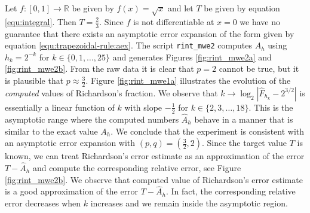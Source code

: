 \documentclass[runningheads]{llncs}
\begin{document}
Let $f : [0,1] \rightarrow \mathbb{R}$ be given by $f(x) = \sqrt{x}$ and let $T$ be given by equation \eqref{equ:integral}.
Then $T = \frac{2}{3}$. Since $f$ is not differentiable at $x=0$ we have no guarantee that there exists an asymptotic error expansion of the form given by equation \eqref{equ:trapezoidal-rule:aex}.
The script {\tt rint\_mwe2} computes $A_h$ using $h_k = 2^{-k}$ for $k \in \{0,1,\dots,25\}$ and generates Figures \ref{fig:rint_mwe2a} and \ref{fig:rint_mwe2b}.
From the raw data it is clear that $p = 2$ cannot be true, but it is plausible that $p \approx \frac{3}{2}$.
Figure \ref{fig:rint_mwe1a} illustrates the evolution of the \emph{computed} values of Richardson's fraction.
We observe that $k \rightarrow \log_2|\hat{F}_{h_k} - 2^{3/2}|$ is essentially a linear function of $k$ with slope $-\frac{1}{2}$ for $k \in \{2,3,\dots,18\}$.
This is the asymptotic range where the computed numbers $\hat{A}_h$ behave in a manner that is similar to the exact value $A_h$. 
We conclude that the experiment is consistent with an asymptotic error expansion with $(p,q)=(\tfrac{3}{2},2)$.
Since the target value $T$ is known, we can treat Richardson's error estimate as an approximation of the error $T-\hat{A}_h$ and compute the corresponding relative error, see Figure \ref{fig:rint_mwe2b}.
We observe that computed value of Richardson's error estimate is a good approximation of the error $T - \hat{A}_h$.
In fact, the corresponding relative error decreases when $k$ increases and we remain inside the asymptotic region.
\end{document}
